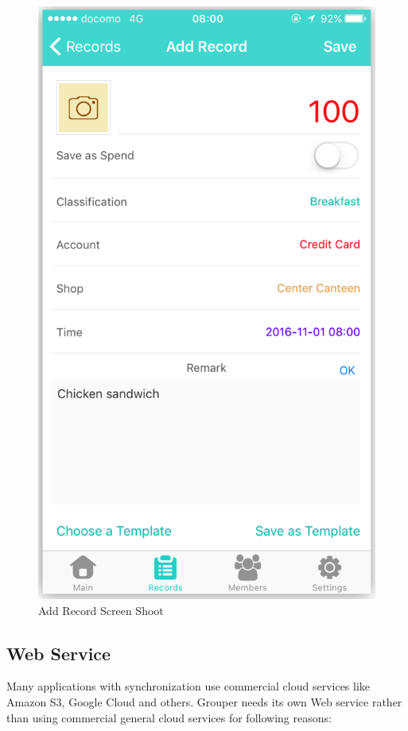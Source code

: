 \documentclass[twocolumn,10pt]{article}
\begin{document}
\begin{figure}[t]
	\centering
	\includegraphics[scale=0.19]{screenshoot}
	\caption{Add Record Screen Shoot}
\end{figure}

\subsection{Web Service}
Many applications with synchronization use commercial cloud services like Amazon S3, Google Cloud and others. Grouper needs its own Web service rather than using commercial general cloud services for following reasons:
\end{document}
